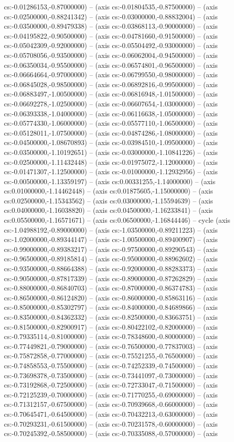 cs:-0.01286153,-0.87000000) -- (axis cs:-0.01804535,-0.87500000) -- (axis cs:-0.02500000,-0.88241342) -- (axis cs:-0.03000000,-0.88832004) -- (axis cs:-0.03500000,-0.89479338) -- (axis cs:-0.03868113,-0.90000000) -- (axis cs:-0.04195822,-0.90500000) -- (axis cs:-0.04781660,-0.91500000) -- (axis cs:-0.05042309,-0.92000000) -- (axis cs:-0.05504492,-0.93000000) -- (axis cs:-0.05708056,-0.93500000) -- (axis cs:-0.06062004,-0.94500000) -- (axis cs:-0.06350034,-0.95500000) -- (axis cs:-0.06574801,-0.96500000) -- (axis cs:-0.06664664,-0.97000000) -- (axis cs:-0.06799550,-0.98000000) -- (axis cs:-0.06845028,-0.98500000) -- (axis cs:-0.06892816,-0.99500000) -- (axis cs:-0.06883497,-1.00500000) -- (axis cs:-0.06816948,-1.01500000) -- (axis cs:-0.06692278,-1.02500000) -- (axis cs:-0.06607654,-1.03000000) -- (axis cs:-0.06393338,-1.04000000) -- (axis cs:-0.06116638,-1.05000000) -- (axis cs:-0.05774330,-1.06000000) -- (axis cs:-0.05577110,-1.06500000) -- (axis cs:-0.05128011,-1.07500000) -- (axis cs:-0.04874286,-1.08000000) -- (axis cs:-0.04500000,-1.08670893) -- (axis cs:-0.03984510,-1.09500000) -- (axis cs:-0.03500000,-1.10192651) -- (axis cs:-0.03000000,-1.10841226) -- (axis cs:-0.02500000,-1.11432448) -- (axis cs:-0.01975072,-1.12000000) -- (axis cs:-0.01471307,-1.12500000) -- (axis cs:-0.01000000,-1.12932956) -- (axis cs:-0.00500000,-1.13359197) -- (axis cs:0.00331255,-1.14000000) -- (axis cs:0.01000000,-1.14462448) -- (axis cs:0.01875605,-1.15000000) -- (axis cs:0.02500000,-1.15343562) -- (axis cs:0.03000000,-1.15594639) -- (axis cs:0.04000000,-1.16038820) -- (axis cs:0.04500000,-1.16233841) -- (axis cs:0.05500000,-1.16571671) -- (axis cs:0.06500000,-1.16844446) -- cycle (axis cs:-1.04988192,-0.89000000) -- (axis cs:-1.03500000,-0.89211223) -- (axis cs:-1.02000000,-0.89344147) -- (axis cs:-1.00500000,-0.89400907) -- (axis cs:-0.99000000,-0.89383217) -- (axis cs:-0.97500000,-0.89290543) -- (axis cs:-0.96500000,-0.89185814) -- (axis cs:-0.95000000,-0.88962602) -- (axis cs:-0.93500000,-0.88664388) -- (axis cs:-0.92000000,-0.88283373) -- (axis cs:-0.90500000,-0.87817339) -- (axis cs:-0.89000000,-0.87262829) -- (axis cs:-0.88000000,-0.86840703) -- (axis cs:-0.87000000,-0.86374783) -- (axis cs:-0.86500000,-0.86124820) -- (axis cs:-0.86000000,-0.85863116) -- (axis cs:-0.85000000,-0.85302797) -- (axis cs:-0.84000000,-0.84689866) -- (axis cs:-0.83500000,-0.84362332) -- (axis cs:-0.82500000,-0.83663751) -- (axis cs:-0.81500000,-0.82900917) -- (axis cs:-0.80422102,-0.82000000) -- (axis cs:-0.79335114,-0.81000000) -- (axis cs:-0.78348600,-0.80000000) -- (axis cs:-0.77449821,-0.79000000) -- (axis cs:-0.76500000,-0.77837003) -- (axis cs:-0.75872858,-0.77000000) -- (axis cs:-0.75521255,-0.76500000) -- (axis cs:-0.74858553,-0.75500000) -- (axis cs:-0.74252339,-0.74500000) -- (axis cs:-0.73698378,-0.73500000) -- (axis cs:-0.73441097,-0.73000000) -- (axis cs:-0.73192868,-0.72500000) -- (axis cs:-0.72733047,-0.71500000) -- (axis cs:-0.72125239,-0.70000000) -- (axis cs:-0.71770255,-0.69000000) -- (axis cs:-0.71312157,-0.67500000) -- (axis cs:-0.70939668,-0.66000000) -- (axis cs:-0.70645471,-0.64500000) -- (axis cs:-0.70432213,-0.63000000) -- (axis cs:-0.70293231,-0.61500000) -- (axis cs:-0.70231578,-0.60000000) -- (axis cs:-0.70245392,-0.58500000) -- (axis cs:-0.70335088,-0.57000000) -- (axis 